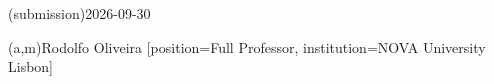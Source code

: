 %
%
\ntdate(submission){2026-09-30}



%
%
%
%
%
%
(a,m){Rodolfo Oliveira}
  [position=Full Professor, institution=NOVA University Lisbon]



